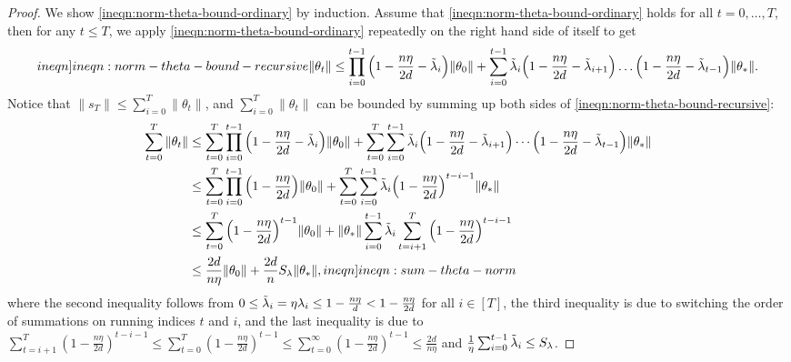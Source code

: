 \begin{proof}
    We show \cref{ineqn:norm-theta-bound-ordinary} by induction. Assume that \eqref{ineqn:norm-theta-bound-ordinary} holds for all $t=0,\ldots,T$, then for any $t\leq T$, we apply \cref{ineqn:norm-theta-bound-ordinary} repeatedly on the right hand side of itself to get
\begin{align}\label[ineqn]{ineqn:norm-theta-bound-recursive}
    \|\theta_t\|\leq \prod_{i=0}^{t-1}\Big(1-\frac{n\eta}{2d}-\tlam_i\Big)\|\theta_0\| + \sum_{i=0}^{t-1}\tlam_i\Big(1-\frac{n\eta}{2d}-\tlam_{i+1}\Big)\dots \Big(1-\frac{n\eta}{2d}-\tlam_{t-1}\Big)\|\theta_\ast\|.
\end{align}
Notice that $\|s_T\| \leq \sum_{i=0}^T \|\theta_t\|$, and $\sum_{i=0}^T \|\theta_t\|$ can be bounded by summing up both sides of \cref{ineqn:norm-theta-bound-recursive}:
\begin{align}
    \sum_{t=0}^T \|\theta_t\|
    &\leq  \sum_{t=0}^T\prod_{i=0}^{t-1}\Big(1-\frac{n\eta}{2d}-\tlam_i\Big)\|\theta_0\| + \sum_{t=0}^T\sum_{i=0}^{t-1}\tlam_i\Big(1-\frac{n\eta}{2d}-\tlam_{i+1}\Big) \cdots \Big(1-\frac{n\eta}{2d}-\tlam_{t-1}\Big)\|\theta_\ast\| \nonumber \\
    &\leq \sum_{t=0}^T\prod_{i=0}^{t-1}\Big(1-\frac{n\eta}{2d}\Big)\|\theta_0\|+\sum_{t=0}^T\sum_{i=0}^{t-1}\tlam_i\Big(1-\frac{n\eta}{2d}\Big)^{t-i-1}\|\theta_\ast\| \nonumber \\
    &\leq \sum_{t=0}^T\Big(1-\frac{n\eta}{2d}\Big)^{t-1}\|\theta_0\| + \|\theta_\ast\|\sum_{i=0}^{t-1}\tlam_i\sum_{t=i+1}^T \Big(1-\frac{n\eta}{2d}\Big)^{t-i-1} \nonumber \\
    &\leq \frac{2d}{n\eta}\|\theta_0\| + \frac{2d}{n} S_\lambda\|\theta_\ast\|, \label[ineqn]{ineqn:sum-theta-norm}
\end{align}
where the second inequality follows from $0\leq \tilde{\lambda}_i = \eta\lambda_i \leq 1-\frac{n\eta}{d} < 1-\frac{n\eta}{2d}$ for all $i\in[T]$, the third inequality is due to switching the order of summations on running indices $t$ and $i$, and the last inequality is due to $\sum_{t=i+1}^T (1-\frac{n\eta}{2d})^{t-i-1} \leq \sum_{t=0}^T(1-\frac{n\eta}{2d})^{t-1} \leq \sum_{t=0}^\infty (1-\frac{n\eta}{2d})^{t-1} \leq \frac{2d}{n\eta}$ and $\frac{1}{\eta}\sum_{i=0}^{t-1}\tilde{\lambda}_i \leq S_\lambda$.


\end{proof}
